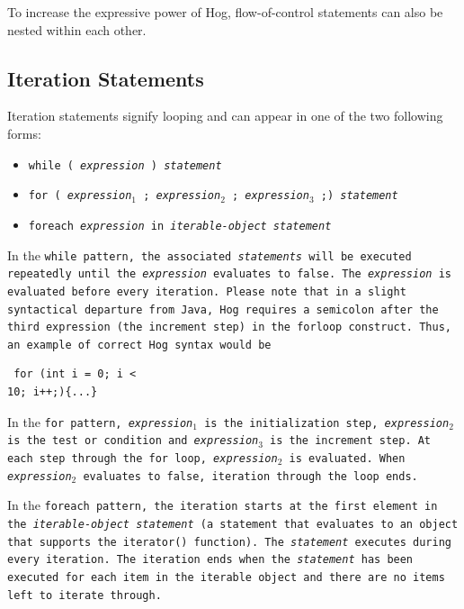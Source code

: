 \documentclass{report}
\begin{document}
To increase the expressive power of Hog, flow-of-control statements can also be
nested within each other.


\subsection{Iteration Statements} %
\label{sub:iteration_statements}

Iteration statements signify looping and can appear in one of the two following
forms:

\begin{itemize}
  \item[] \tt while ( \rm \emph{expression} \tt ) \rm \emph{statement}
  \item[] \tt for ( \rm \emph{expression}$_1$ \tt ; \rm \emph{expression}$_2$ \tt ; \rm \emph{expression}$_3$ \tt ;) \rm \emph{statement}
  \item[] \tt foreach \rm \emph{expression} \tt in \rm \emph{iterable-object statement}
\end{itemize}

In the \tt while \rm pattern, the associated \emph{statements} will be executed
repeatedly until the \emph{expression} evaluates to \tt false\rm. The
\emph{expression} is evaluated before every iteration. Please note that in a
slight syntactical departure from Java, Hog requires a semicolon after the
third expression (the increment step) in the \tt for\rm loop construct. Thus,
an example of correct Hog syntax would be \begin{verbatim} for (int i = 0; i <
10; i++;){...}\end{verbatim}

In the \tt for \rm pattern, \emph{expression}$_1$ is the initialization step,
\emph{expression}$_2$ is the test or condition and \emph{expression}$_3$ is the
increment step. At each step through the for loop, \emph{expression}$_2$ is
evaluated. When \emph{expression}$_2$ evaluates to false, iteration through the
loop ends.

In the \tt foreach \rm pattern, the iteration starts at the first element in the
\emph{iterable-object statement} (a statement that evaluates to an object that
supports the \tt iterator() \rm function). The \emph{statement} executes during
every iteration. The iteration ends when the \emph{statement} has been executed
for each item in the iterable object and there are no items left to iterate
through.
\end{document}
